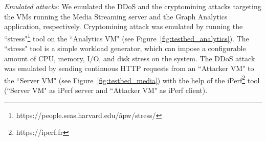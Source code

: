 \textit{Emulated attacks}: We emulated the DDoS and the cryptomining attacks targeting the VMs running the Media Streaming server and the Graph Analytics application, respectively. 
Cryptomining attack was emulated by running the ``stress"\footnote{https://people.seas.harvard.edu/\~apw/stress/} tool on the ``Analytics VM" (see Figure~\ref{fig:testbed_analytics}). The ``stress" tool is a simple workload generator, which can impose a configurable amount of CPU, memory, I/O, and disk stress on the system. 
The DDoS attack was emulated by sending continuous HTTP requests from an ``Attacker VM" to the ``Server VM" (see Figure~\ref{fig:testbed_media}) with the help of the iPerf\footnote{https://iperf.fr} tool (``Server VM" as iPerf server and ``Attacker VM" as iPerf client).

